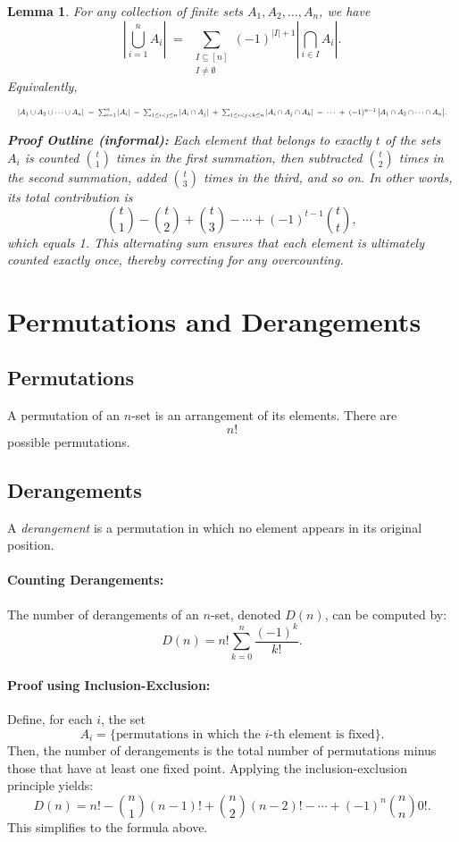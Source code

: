 \documentclass{article}
\newtheorem{lemma}{Lemma}
\begin{document}
\begin{lemma}
\label{lem:PIE}
For any collection of finite sets \(A_1, A_2, \ldots, A_n\), we have
\[
\left|\bigcup_{i=1}^{n} A_i\right|
\;=\;
\sum_{\substack{I \subseteq [n] \\ I \neq \emptyset}}
(-1)^{\lvert I\rvert + 1}
\left|\bigcap_{i \in I} A_i\right|.
\]
Equivalently,

\[
\resizebox{\textwidth}{!}{$
|A_1 \cup A_2 \cup \cdots \cup A_n|
\;=\;
\sum_{i=1}^n |A_i|
\;-\;
\sum_{1 \le i < j \le n} |A_i \cap A_j|
\;+\;
\sum_{1 \le i < j < k \le n} |A_i \cap A_j \cap A_k|
\;-\;\cdots\;
+\;
(-1)^{n-1}\,\bigl|A_1 \cap A_2 \cap \cdots \cap A_n\bigr|.
$}
\]


\noindent \textbf{Proof Outline (informal):} Each element that belongs to exactly \(t\) of the sets \(A_i\) is counted \(\binom{t}{1}\) times in the first summation, then subtracted \(\binom{t}{2}\) times in the second summation, added \(\binom{t}{3}\) times in the third, and so on. In other words, its total contribution is
\[
\binom{t}{1} - \binom{t}{2} + \binom{t}{3} - \cdots + (-1)^{t-1}\binom{t}{t},
\]
which equals 1. This alternating sum ensures that each element is ultimately counted exactly once, thereby correcting for any overcounting.

\end{lemma}

\section{Permutations and Derangements}

\subsection{Permutations}
A permutation of an $n$-set is an arrangement of its elements. There are
\[
n!
\]
possible permutations.

\subsection{Derangements}
A \emph{derangement} is a permutation in which no element appears in its original position.  
\paragraph{Counting Derangements:}  
The number of derangements of an $n$-set, denoted $D(n)$, can be computed by:
\[
D(n) = n! \sum_{k=0}^{n} \frac{(-1)^k}{k!}.
\]
\paragraph{Proof using Inclusion-Exclusion:}  
Define, for each $i$, the set
\[
A_i = \{\text{permutations in which the } i\text{-th element is fixed}\}.
\]
Then, the number of derangements is the total number of permutations minus those that have at least one fixed point. Applying the inclusion-exclusion principle yields:
\[
D(n) = n! - \binom{n}{1}(n-1)! + \binom{n}{2}(n-2)! - \cdots + (-1)^n \binom{n}{n}0!.
\]
This simplifies to the formula above.
\end{document}
